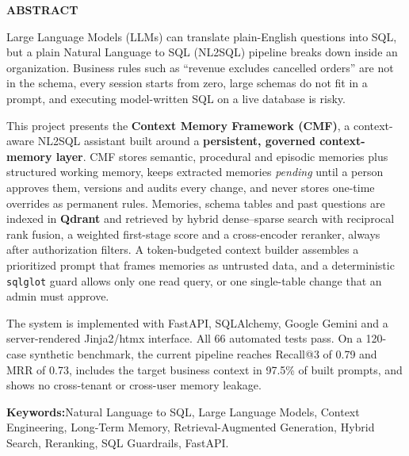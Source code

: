 \newpage
\thispagestyle{plain}
\begingroup
\setlength{\parskip}{6pt}
\fontsize{12}{18}\selectfont

\begin{center}
    {\fontsize{16}{24}\selectfont\bfseries ABSTRACT\\[12pt]}
\end{center}

Large Language Models (LLMs) can translate plain-English questions into SQL, but a plain
Natural Language to SQL (NL2SQL) pipeline breaks down inside an organization. Business
rules such as ``revenue excludes cancelled orders'' are not in the schema, every session
starts from zero, large schemas do not fit in a prompt, and executing model-written SQL on a
live database is risky.

This project presents the \textbf{Context Memory Framework (CMF)}, a context-aware NL2SQL
assistant built around a \textbf{persistent, governed context-memory layer}. CMF stores
semantic, procedural and episodic memories plus structured working memory, keeps extracted
memories \textit{pending} until a person approves them, versions and audits every change,
and never stores one-time overrides as permanent rules. Memories, schema tables and past
questions are indexed in \textbf{Qdrant} and retrieved by hybrid dense--sparse search with
reciprocal rank fusion, a weighted first-stage score and a cross-encoder reranker, always
after authorization filters. A token-budgeted context builder assembles a prioritized prompt
that frames memories as untrusted data, and a deterministic \texttt{sqlglot} guard allows
only one read query, or one single-table change that an admin must approve.

The system is implemented with FastAPI, SQLAlchemy, Google Gemini and a server-rendered
Jinja2/htmx interface. All 66 automated tests pass. On a 120-case synthetic benchmark, the
current pipeline reaches Recall@3 of 0.79 and MRR of 0.73, includes the target business
context in 97.5\% of built prompts, and shows no cross-tenant or cross-user memory leakage.

\vspace{0.6cm}
\noindent\textbf{Keywords:}\enspace Natural Language to SQL, Large Language Models,
Context Engineering, Long-Term Memory, Retrieval-Augmented Generation, Hybrid Search,
Reranking, SQL Guardrails, FastAPI.

\endgroup
\clearpage
